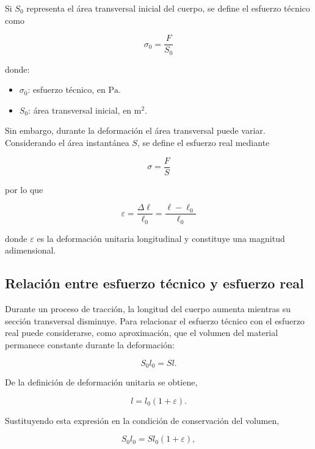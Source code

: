 \documentclass[11pt,a4paper]{article}
\begin{document}
Si $S_0$ representa el área transversal inicial del cuerpo, se define el
esfuerzo técnico como

\begin{equation}
\boxed{\sigma_0=\frac{F}{S_0}}
\label{eq:esfuerzo_tecnico}
\end{equation}

donde:

\begin{itemize}
    \item $\sigma_0$: esfuerzo técnico, en $\mathrm{Pa}$.
    \item $S_0$: área transversal inicial, en $\mathrm{m^2}$.
\end{itemize}

Sin embargo, durante la deformación el área transversal puede variar.
Considerando el área instantánea $S$, se define el esfuerzo real mediante

\begin{equation}
\boxed{\sigma=\frac{F}{S}}
\label{eq:esfuerzo_real}
\end{equation}

por lo que

\begin{equation}
\boxed{
\varepsilon=
\frac{\Delta\ell}{\ell_0}
=
\frac{\ell-\ell_0}{\ell_0}
}
\label{eq:deformacion_unitaria}
\end{equation}

donde $\varepsilon$ es la deformación unitaria longitudinal y constituye una
magnitud adimensional.


\subsection{Relación entre esfuerzo técnico y esfuerzo real}

Durante un proceso de tracción, la longitud del cuerpo aumenta mientras su
sección transversal disminuye. Para relacionar el esfuerzo técnico con el
esfuerzo real puede considerarse, como aproximación, que el volumen del
material permanece constante durante la deformación:

\[
S_0l_0=Sl.
\]

De la definición de deformación unitaria se obtiene,

\[
l=l_0(1+\varepsilon).
\]

Sustituyendo esta expresión en la condición de conservación del volumen,

\[
S_0l_0=Sl_0(1+\varepsilon),
\]
\end{document}
